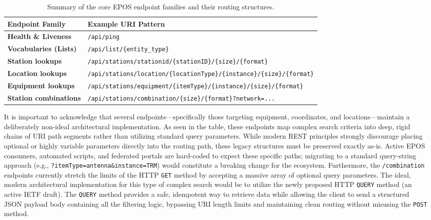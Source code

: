 \begin{table}[H]
	\centering
	\renewcommand{\arraystretch}{1.2}
	\begin{tabular}{lp{10cm}}
		\toprule \textbf{Endpoint Family}    & \textbf{Example \ac{URI} Pattern}                                                            \\
		\midrule \textbf{Health \& Liveness} & \texttt{/api/ping}                                                                           \\
		\textbf{Vocabularies (Lists)}        & \texttt{/api/list/\{entity\_type\}}                                                          \\
		\textbf{Station lookups}             & \texttt{/api/stations/stationid/\{stationID\}/\allowbreak\{size\}/\{format\}}                \\
		\textbf{Location lookups}            & \texttt{/api/stations/location/\{locationType\}/\allowbreak\{instance\}/\{size\}/\{format\}} \\
		\textbf{Equipment lookups}           & \texttt{/api/stations/equipment/\{itemType\}/\allowbreak\{instance\}/\{size\}/\{format\}}    \\
		\textbf{Station combinations}        & \texttt{/api/stations/combination/\{size\}/\allowbreak\{format\}?network=...}                \\
		\bottomrule
	\end{tabular}
	\caption{Summary of the core \ac{EPOS} endpoint families and their routing
	structures.}
	\label{tab:core-endpoints}
\end{table}

It is important to acknowledge that several endpoints—specifically those
targeting equipment, coordinates, and locations—maintain a deliberately non-ideal
architectural implementation. As seen in the table, these endpoints map
complex search criteria into deep, rigid chains of \ac{URI} path segments
rather than utilizing standard query parameters. While modern \ac{REST}
principles strongly discourage placing optional or highly variable
parameters directly into the routing path, these legacy structures must be preserved
exactly as-is. Active \ac{EPOS} consumers, automated scripts, and federated portals
are hard-coded to expect these specific paths; migrating to a standard
query-string approach (e.g., \texttt{?itemType=antenna\&instance=TRM}) would
constitute a breaking change for the ecosystem.
\medskip
Furthermore, the \texttt{/combination} endpoints currently stretch the
limits of the \ac{HTTP} \texttt{GET} method by accepting a massive array of
optional query parameters. The ideal, modern architectural implementation
for this type of complex search would be to utilize the newly proposed \ac{HTTP}
\texttt{QUERY} method (an active \ac{IETF} draft). The \texttt{QUERY} method
provides a safe, idempotent way to retrieve data while allowing the client
to send a structured \ac{JSON} payload body containing all the filtering logic,
bypassing \ac{URI} length limits and maintaining clean routing without misusing
the \texttt{POST} method.


